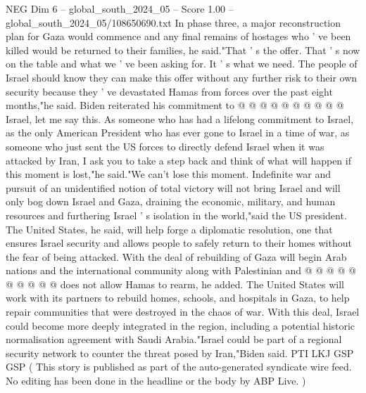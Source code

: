 \begin{textsample}{NEG Dim 6 – global\_south\_2024\_05 – Score 1.00 – global\_south\_2024\_05/108650690.txt}
In phase three, a major reconstruction plan for Gaza would commence and any final remains of hostages who ' ve been killed would be returned to their families, he said."That ' s the offer.
That ' s now on the table and what we ' ve been asking for.
It ' s what we need.
The people of Israel should know they can make this offer without any further risk to their own security because they ' ve devastated Hamas from forces over the past eight months,"he said.
Biden reiterated his commitment to @ @ @ @ @ @ @ @ @ @ Israel, let me say this.
As someone who has had a lifelong commitment to Israel, as the only American President who has ever gone to Israel in a time of war, as someone who just sent the US forces to directly defend Israel when it was attacked by Iran, I ask you to take a step back and think of what will happen if this moment is lost,"he said."We can't lose this moment.
Indefinite war and pursuit of an unidentified notion of total victory will not bring Israel and will only bog down Israel and Gaza, draining the economic, military, and human resources and furthering Israel ' s isolation in the world,"said the US president.
The United States, he said, will help forge a diplomatic resolution, one that ensures Israel security and allows people to safely return to their homes without the fear of being attacked.
With the deal of rebuilding of Gaza will begin Arab nations and the international community along with Palestinian and @ @ @ @ @ @ @ @ @ @ does not allow Hamas to rearm, he added.
The United States will work with its partners to rebuild homes, schools, and hospitals in Gaza, to help repair communities that were destroyed in the chaos of war.
With this deal, Israel could become more deeply integrated in the region, including a potential historic normalisation agreement with Saudi Arabia."Israel could be part of a regional security network to counter the threat posed by Iran,"Biden said.
PTI LKJ GSP GSP ( This story is published as part of the auto-generated syndicate wire feed.
No editing has been done in the headline or the body by ABP Live. )

\end{textsample}
